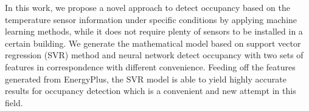

In this work, we propose a novel approach to detect occupancy based on
the temperature sensor information under specific conditions by
applying machine learning methods, while it does not require plenty of
sensors to be installed in a certain building.  We generate the
mathematical model based on support vector regression (SVR) method and
neural network detect occupancy with two sets of features in
correspondence with different convenience. Feeding off the features
generated from EnergyPlus, the SVR model is able to yield highly
accurate results for occupancy detection which is a convenient and new
attempt in this field.

